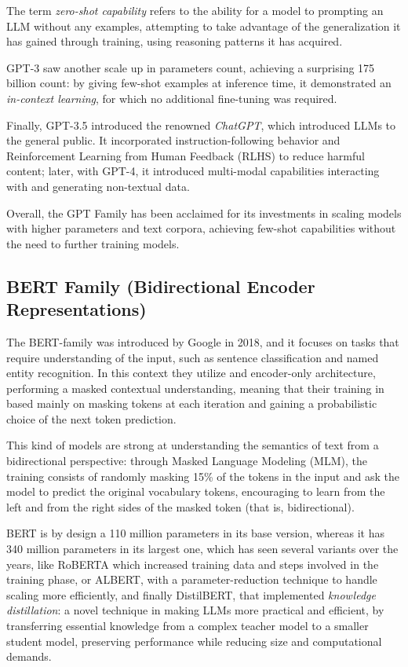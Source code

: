 The term \textit{zero-shot capability} refers to the ability for a model to prompting an LLM without any examples, attempting to take advantage of the generalization it has gained through training, using reasoning patterns it has acquired.

GPT-3 saw another scale up in parameters count, achieving a surprising 175 billion count: by giving few-shot examples at inference time, it demonstrated an \textit{in-context learning}, for which no additional fine-tuning was required.

Finally, GPT-3.5 introduced the renowned \textit{ChatGPT}, which introduced LLMs to the general public. It incorporated instruction-following behavior and Reinforcement Learning from Human Feedback (RLHS) to reduce harmful content; later, with GPT-4, it introduced multi-modal capabilities interacting with and generating non-textual data.

Overall, the GPT Family has been acclaimed for its investments in scaling models with higher parameters and text corpora, achieving few-shot capabilities without the need to further training models.


\subsection{BERT Family (Bidirectional Encoder Representations)}

The BERT-family was introduced by Google in 2018, and it focuses on tasks that require understanding of the input, such as sentence classification and named entity recognition. In this context they utilize and encoder-only architecture, performing a masked contextual understanding, meaning that their training in based mainly on masking tokens at each iteration and gaining a probabilistic choice of the next token prediction.

This kind of models are strong at understanding the semantics of text from a bidirectional perspective: through Masked Language Modeling (MLM), the training consists of randomly masking 15\% of the tokens in the input and ask the model to predict the original vocabulary tokens, encouraging to learn from the left and from the right sides of the masked token (that is, bidirectional).

BERT is by design a 110 million parameters in its base version, whereas it has 340 million parameters in its largest one, which has seen several variants over the years, like RoBERTA which increased training data and steps involved in the training phase, or ALBERT, with a parameter-reduction technique to handle scaling more efficiently, and finally DistilBERT, that implemented \textit{knowledge distillation}: a novel technique in making LLMs more practical and efficient, by transferring essential knowledge from a complex teacher model to a smaller student model, preserving performance while reducing size and computational demands.


